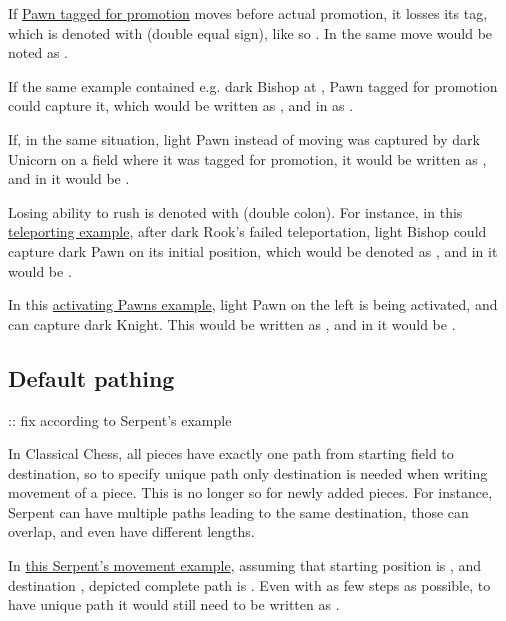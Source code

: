 If \hyperref[fig:scn_aoa_04_delayed_promo_pawn_2_tagged]{Pawn tagged for promotion} moves
before actual promotion, it losses its tag, which is denoted with \alg{==} (double equal
sign), like so . In  the same move would be noted as .

If the same example contained e.g. dark Bishop at , Pawn tagged for promotion could
capture it, which would be written as , and in  as .

If, in the same situation, light Pawn instead of moving was captured by dark Unicorn on a
field where it was tagged for promotion, it would be written as , and in
 it would be .

Losing ability to rush is denoted with \alg{::} (double colon). For instance, in this
\hyperref[fig:scn_n_03_teleport_move_2]{teleporting example}, after dark Rook's failed
teleportation, light Bishop could capture dark Pawn on its initial position, which would
be denoted as , and in  it would be .

In this \hyperref[fig:scn_mv_31_activating_rush_pawn_init]{activating Pawns example}, light
Pawn on the left is being activated, and can capture dark Knight. This would be written as
, and in  it would be
\alg{[Re6-e2]\~{}[We2-c2]\~{}[P::c2-b3*N]}.

\subsection*{Default pathing}
\label{sec:Appendix/Notation/Default pathing}

\TODO :: fix according to Serpent's example

In Classical Chess, all pieces have exactly one path from starting field to destination,
so to specify unique path only destination is needed when writing movement of a piece.
This is no longer so for newly added pieces. For instance, Serpent can have multiple paths
leading to the same destination, those can overlap, and even have different lengths.

In \hyperref[fig:scn_tr_05_serpent_end]{this Serpent's movement example}, assuming that
starting position is , and destination , depicted complete path is
. Even with as few steps as possible, to have unique path
it would still need to be written as .


